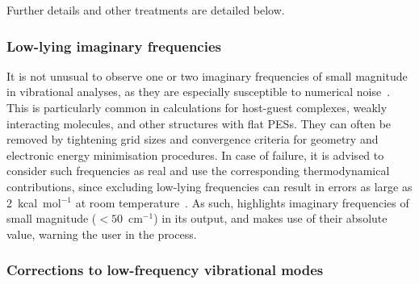 Further details and other treatments are detailed below.

\subsubsection{Low-lying imaginary frequencies}

It is not unusual to observe one or two imaginary frequencies of small magnitude in vibrational analyses,
as they are especially susceptible to numerical noise~\cite{Jensen_2015}.
This is particularly common in calculations for host-guest complexes,
weakly interacting molecules,
and other structures with flat PESs.
They can often be removed by tightening grid sizes and convergence criteria for geometry and electronic energy minimisation procedures.
In case of failure,
it is advised to consider such frequencies as real and use the corresponding thermodynamical contributions,
since excluding low-lying frequencies can result in errors as large as 2~kcal~mol$^{-1}$ at room temperature~\cite{Jensen_2015}.
As such,
\overreact{} highlights imaginary frequencies of small magnitude ($< 50$~cm$^{-1}$) in its output,
and makes use of their absolute value,
warning the user in the process.

\subsubsection{Corrections to low-frequency vibrational modes}%
\label{sec:quasi-rrho}

